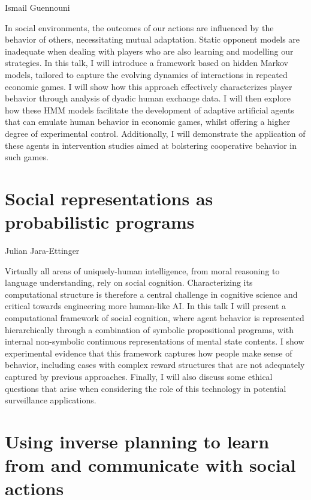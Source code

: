 \documentclass[10pt, letterpaper]{article}
\begin{document}
\begin{center}
Ismail Guennouni
\end{center}

In social environments, the outcomes of our actions are influenced by
the behavior of others, necessitating mutual adaptation. Static opponent
models are inadequate when dealing with players who are also learning
and modelling our strategies. In this talk, I will introduce a framework
based on hidden Markov models, tailored to capture the evolving dynamics
of interactions in repeated economic games. I will show how this
approach effectively characterizes player behavior through analysis of
dyadic human exchange data. I will then explore how these HMM models
facilitate the development of adaptive artificial agents that can
emulate human behavior in economic games, whilst offering a higher
degree of experimental control. Additionally, I will demonstrate the
application of these agents in intervention studies aimed at bolstering
cooperative behavior in such games.

\hypertarget{social-representations-as-probabilistic-programs}{%
\section{Social representations as probabilistic
programs}\label{social-representations-as-probabilistic-programs}}

\begin{center}
Julian Jara-Ettinger
\end{center}

Virtually all areas of uniquely-human intelligence, from moral reasoning
to language understanding, rely on social cognition. Characterizing its
computational structure is therefore a central challenge in cognitive
science and critical towards engineering more human-like AI. In this
talk I will present a computational framework of social cognition, where
agent behavior is represented hierarchically through a combination of
symbolic propositional programs, with internal non-symbolic continuous
representations of mental state contents. I show experimental evidence
that this framework captures how people make sense of behavior,
including cases with complex reward structures that are not adequately
captured by previous approaches. Finally, I will also discuss some
ethical questions that arise when considering the role of this
technology in potential surveillance applications.

\hypertarget{using-inverse-planning-to-learn-from-and-communicate-with-social-actions}{%
\section{Using inverse planning to learn from and communicate with
social
actions}\label{using-inverse-planning-to-learn-from-and-communicate-with-social-actions}}
\end{document}
